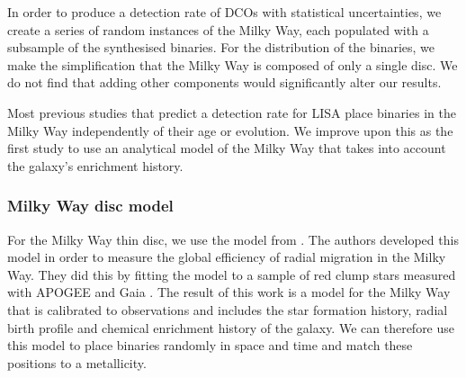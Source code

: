 \documentclass[twocolumn]{aastex63}
\begin{document}
In order to produce a detection rate of DCOs with statistical uncertainties, we create a series of random instances of the Milky Way, each populated with a subsample of the synthesised binaries. For the distribution of the binaries, we make the simplification that the Milky Way is composed of only a single disc. We do not find that adding other components would significantly alter our results.

Most previous studies that predict a detection rate for LISA place binaries in the Milky Way independently of their age or evolution. We improve upon this as the first study to use an analytical model of the Milky Way that takes into account the galaxy's enrichment history.

\subsubsection{Milky Way disc model}

For the Milky Way thin disc, we use the model from \citet{Frankel+2018}. The authors developed this model in order to measure the global efficiency of radial migration in the Milky Way. They did this by fitting the model to a sample of red clump stars measured with APOGEE \citep{Majewski+2017} and Gaia \citep{GaiaCollaboration+2016}. The result of this work is a model for the Milky Way that is calibrated to observations and includes the star formation history, radial birth profile and chemical enrichment history of the galaxy. We can therefore use this model to place binaries randomly in space and time and match these positions to a metallicity.
\end{document}
